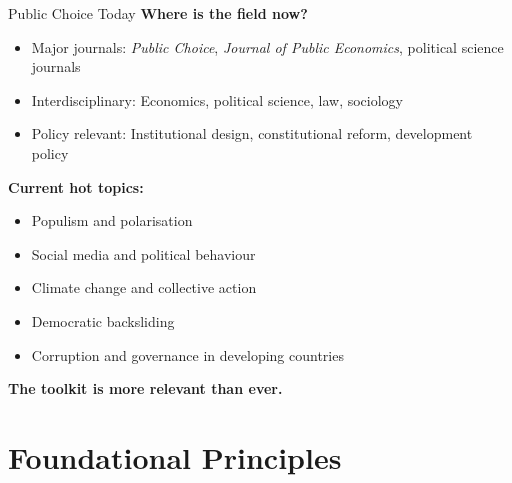 \documentclass[10pt]{beamer}
\begin{document}
\begin{frame}{Public Choice Today}
\textbf{Where is the field now?}
\begin{itemize}
\item Major journals: \textit{Public Choice}, \textit{Journal of Public Economics}, political science journals
\item Interdisciplinary: Economics, political science, law, sociology
\item Policy relevant: Institutional design, constitutional reform, development policy
\end{itemize}


\textbf{Current hot topics:}
\begin{itemize}
\item Populism and polarisation
\item Social media and political behaviour
\item Climate change and collective action
\item Democratic backsliding
\item Corruption and governance in developing countries
\end{itemize}


\textbf{The toolkit is more relevant than ever.}
\end{frame}

\section{Foundational Principles}
\end{document}
